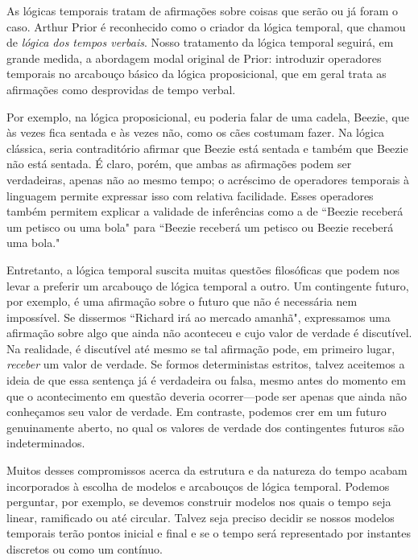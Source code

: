 \documentclass[../../../include/open-logic-section]{subfiles}
\begin{document}


As lógicas temporais tratam de afirmações sobre coisas que serão ou já
foram o caso. Arthur Prior é reconhecido como o criador da lógica
temporal, que chamou de \emph{lógica dos tempos verbais}. Nosso
tratamento da lógica temporal seguirá, em grande medida, a abordagem
modal original de Prior: introduzir operadores temporais no arcabouço
básico da lógica proposicional, que em geral trata as afirmações como
desprovidas de tempo verbal.

Por exemplo, na lógica proposicional, eu poderia falar de uma cadela,
Beezie, que às vezes fica sentada e às vezes não, como os cães costumam
fazer. Na lógica clássica, seria contraditório afirmar que Beezie está
sentada e também que Beezie não está sentada. É claro, porém, que ambas
as afirmações podem ser verdadeiras, apenas não ao mesmo tempo; o
acréscimo de operadores temporais à linguagem permite expressar isso
com relativa facilidade. Esses operadores também permitem explicar a
validade de inferências como a de ``Beezie receberá um petisco ou uma
bola" para ``Beezie receberá um petisco ou Beezie receberá uma bola." 

Entretanto, a lógica temporal suscita muitas questões filosóficas que
podem nos levar a preferir um arcabouço de lógica temporal a outro. Um
contingente futuro, por exemplo, é uma afirmação sobre o futuro que não
é necessária nem impossível. Se dissermos ``Richard irá ao mercado
amanhã", expressamos uma afirmação sobre algo que ainda não aconteceu e
cujo valor de verdade é discutível. Na realidade, é discutível até
mesmo se tal afirmação pode, em primeiro lugar, \emph{receber} um valor
de verdade. Se formos deterministas estritos, talvez aceitemos a ideia
de que essa sentença já é verdadeira ou falsa, mesmo antes do momento
em que o acontecimento em questão deveria ocorrer---pode ser apenas que
ainda não conheçamos seu valor de verdade. Em contraste, podemos crer
em um futuro genuinamente aberto, no qual os valores de verdade dos
contingentes futuros são indeterminados. 

Muitos desses compromissos acerca da estrutura e da natureza do tempo
acabam incorporados à escolha de modelos e arcabouços de lógica
temporal. Podemos perguntar, por exemplo, se devemos construir modelos
nos quais o tempo seja linear, ramificado ou até circular. Talvez seja
preciso decidir se nossos modelos temporais terão pontos inicial e
final e se o tempo será representado por instantes discretos ou como um
contínuo. 
\end{document}
